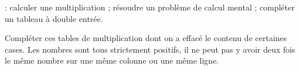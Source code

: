 \begin{changemargin}{-10mm}{-15mm}
\begin{activite}    
    \hspace*{-10mm}{\bf Objectifs} : calculer une multiplication ; résoudre un problème de calcul mental ; compléter un tableau à double entrée.

    Compléter ces tables de multiplication dont on a effacé le contenu de certaines cases. Les nombres sont tous strictement positifs, il ne peut pas y avoir deux fois le même nombre sur une même colonne ou une même ligne.
    {\renewcommand{\arraystretch}{1.8}
       \hfill
       \hfill
       \hfill
       \hfill
       \hspace*{1cm} \\
          
}
\end{activite}
\end{changemargin}

